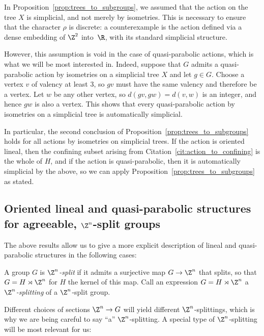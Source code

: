 \begin{rema}
\label{rem:simplicial}
    In Proposition~\ref{prop:trees_to_subgroups}, we assumed that the action on the tree $X$ is simplicial, and not merely by isometries. This is necessary to ensure that the character $\rho$ is discrete: a counterexample is the action defined via a dense embedding of $\Z^2$ into~$\R$, with its standard simplicial structure.

    However, this assumption is void in the case of quasi-parabolic actions, which is what we will be most interested in. Indeed, suppose that $G$ admits a quasi-parabolic action by isometries on a simplicial tree $X$ and let $g \in G$. Choose a vertex $v$ of valency at least $3$, so $gv$ must have the same valency and therefore be a vertex. Let $w$ be any other vertex, so $d(gv, gw) = d(v, w)$ is an integer, and hence $gw$ is also a vertex. This shows that every quasi-parabolic action by isometries on a simplicial tree is automatically simplicial.

    In particular, the second conclusion of Proposition~\ref{prop:trees_to_subgroups} holds for all actions by isometries on simplicial trees. If the action is oriented lineal, then the confining subset arising from Citation~\ref{cit:action_to_confining} is the whole of $H$, and if the action is quasi-parabolic, then it is automatically simplicial by the above, so we can apply Proposition~\ref{prop:trees_to_subgroups} as stated.
\end{rema}


\subsection{Oriented lineal and quasi-parabolic structures for agreeable, \texorpdfstring{$\Z^n$}{Zn}-split groups}\label{ssec:lin_qp}

The above results allow us to give a more explicit description of lineal and quasi-parabolic structures in the following cases:

\begin{defi}[$\Z^n$-split]
A group $G$ is \emph{$\Z^n$-split} if it admits a surjective map $G\to\Z^n$ that splits, so that $G=H\rtimes \Z^n$ for $H$ the kernel of this map. Call an expression $G=H\rtimes \Z^n$ a \emph{$\Z^n$-splitting} of a $\Z^n$-split group.
\end{defi}

Different choices of sections $\Z^n\to G$ will yield different $\Z^n$-splittings, which is why we are being careful to say ``a'' $\Z^n$-splitting. A special type of $\Z^n$-splitting will be most relevant for us:

